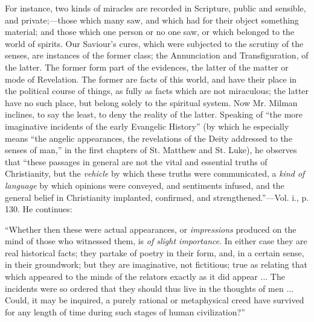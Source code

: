 For instance, two kinds of miracles are recorded
in Scripture, public and sensible, and private;—those which many
saw, and which had for their object something material; and those
which one person or no one saw, or which belonged to the world of
spirits. Our Saviour's cures, which were subjected to the scrutiny of
the senses, are instances of the former class; the Annunciation and
Transfiguration, of the latter. The former form part of the evidences,
the latter of the matter or mode of Revelation. The former are facts
of this world, and have their place in the political course of things,
as fully as facts which are not miraculous; the latter have no such
place, but belong solely to the spiritual system. Now Mr. Milman
inclines, to say the least, to deny the reality of the latter.
Speaking of ``the more imaginative incidents of the early Evangelic
History'' (by which he especially means ``the angelic appearances, the
revelations of the Deity addressed to the senses of man,'' in the first
chapters of St. Matthew and St. Luke), he observes that ``these
passages in general are not the vital and essential truths of
Christianity, but the \emph{vehicle} by which these truths were
communicated, a \emph{kind of language} by which opinions were
conveyed, and sentiments infused, and the general belief in
Christianity implanted, confirmed, and strengthened.''—Vol. i., p.
130. He continues:

``Whether
then these were actual appearances, or \emph{impressions} produced on
the mind of those who witnessed them, is \emph{of slight importance}.
In either case they are real historical facts; they partake of poetry
in their form, and, in a certain sense, in their groundwork;
but they are imaginative, not fictitious; true as relating that which
appeared to the minds of the relators exactly as it did appear ... The
incidents were so ordered that they should thus live in the thoughts
of men ... Could, it may be inquired, a purely rational or
metaphysical creed have survived for any length of time during such
stages of human civilization?''

